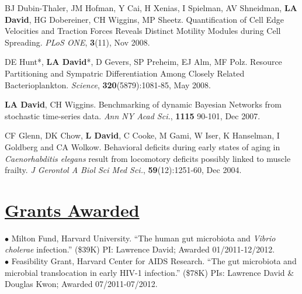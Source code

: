 \documentclass[overlapped,line,11pt]{res}
\begin{document}
\begin{resume}
\begin{revnumerate}[11]
\vspace*{1mm}
\item { BJ Dubin-Thaler, JM Hofman, Y Cai, H Xenias, I Spielman, AV
  Shneidman, \textbf{LA David}, HG Dobereiner, CH Wiggins, MP Sheetz.
  Quantification of Cell Edge Velocities and Traction Forces Reveals
  Distinct Motility Modules during Cell Spreading. {\em PLoS ONE},
  \textbf{3}(11), Nov 2008.}

\vspace*{1mm}
\item {DE Hunt*, \textbf{LA David}*, D Gevers, SP Preheim, EJ Alm, MF
Polz.  Resource Partitioning and Sympatric Differentiation Among
Closely Related Bacterioplankton.  {\em Science},
\textbf{320}(5879):1081-85, May 2008.}

\vspace*{1mm}
\item {\textbf{LA David}, CH Wiggins. Benchmarking of dynamic Bayesian
  Networks from stochastic time-series data. {\em Ann NY Acad Sci.},
  \textbf{1115} 90-101, Dec 2007.}

\vspace*{1mm}
\item {CF Glenn, DK Chow, \textbf{L David}, C Cooke, M Gami, W Iser, K
  Hanselman, I Goldberg and CA Wolkow. Behavioral deficits during
  early states of aging in {\em Caenorhabditis elegans} result from
  locomotory deficits possibly linked to muscle frailty. {\em J
    Gerontol A Biol Sci Med Sci.}, \textbf{59}(12):1251-60, Dec 2004.}
\end{revnumerate}

\section{\underline{\sc Grants Awarded}} 
\vspace{.05in}

\hangindent=0.5in $\bullet$\hspace{.1in} Milton Fund, Harvard
University. ``The human gut microbiota and \emph{Vibrio cholerae}
infection.'' (\$39K) PI: Lawrence David; Awarded 01/2011-12/2012. \\

\vspace{-10mm}
\hangindent=0.5in $\bullet$\hspace{.1in} Feasibility Grant, Harvard
Center for AIDS Research. ``The gut microbiota and microbial
translocation in early HIV-1 infection.'' (\$78K) PIs: Lawrence David
\& Douglas Kwon; Awarded 07/2011-07/2012.


\end{resume}
\end{document}
